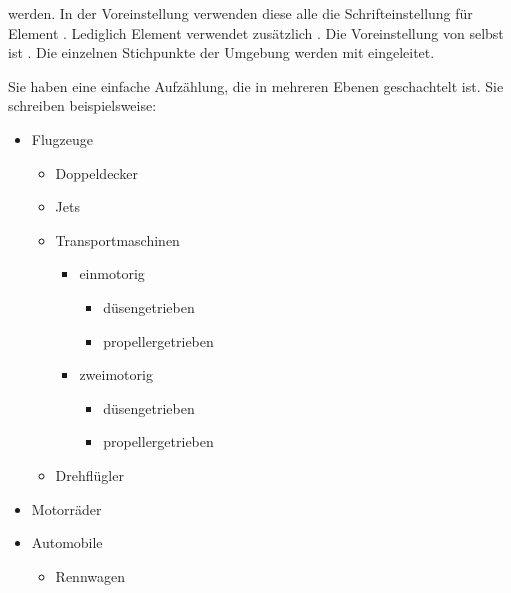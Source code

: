   werden. In der Voreinstellung verwenden diese alle die Schrifteinstellung
  für Element
  . Lediglich
  Element  verwendet zusätzlich .
  Die Voreinstellung von  selbst ist
  .%
  Die einzelnen Stichpunkte der Umgebung werden mit
   eingeleitet.%
    \begin{Example}
      Sie haben eine einfache Aufzählung, die in mehreren Ebenen geschachtelt
      ist. Sie schreiben beispielsweise:
\begin{lstcode}
  \begin{itemize}
  \item Flugzeuge
    \begin{itemize}
    \item Doppeldecker
    \item Jets
    \item Transportmaschinen
      \begin{itemize}
      \item einmotorig
        \begin{itemize}
        \item{düsengetrieben}
        \item{propellergetrieben}
        \end{itemize}
      \item zweimotorig
        \begin{itemize}
        \item{düsengetrieben}
        \item{propellergetrieben}
        \end{itemize}
      \end{itemize}
    \item Drehflügler
    \end{itemize}
  \item Motorräder
  \item Automobile
    \begin{itemize}
    \item Rennwagen

\end{itemize}
\end{itemize}
\end{lstcode}
\end{Example}
